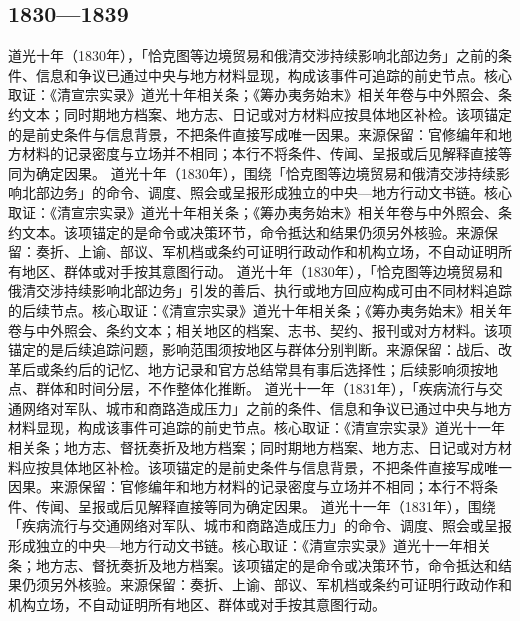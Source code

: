 \subsection{1830—1839}
道光十年（1830年），「恰克图等边境贸易和俄清交涉持续影响北部边务」之前的条件、信息和争议已通过中央与地方材料显现，构成该事件可追踪的前史节点。核心取证：《清宣宗实录》道光十年相关条；《筹办夷务始末》相关年卷与中外照会、条约文本；同时期地方档案、地方志、日记或对方材料应按具体地区补检。该项锚定的是前史条件与信息背景，不把条件直接写成唯一因果。来源保留：官修编年和地方材料的记录密度与立场并不相同；本行不将条件、传闻、呈报或后见解释直接等同为确定因果。
道光十年（1830年），围绕「恰克图等边境贸易和俄清交涉持续影响北部边务」的命令、调度、照会或呈报形成独立的中央—地方行动文书链。核心取证：《清宣宗实录》道光十年相关条；《筹办夷务始末》相关年卷与中外照会、条约文本。该项锚定的是命令或决策环节，命令抵达和结果仍须另外核验。来源保留：奏折、上谕、部议、军机档或条约可证明行政动作和机构立场，不自动证明所有地区、群体或对手按其意图行动。
道光十年（1830年），「恰克图等边境贸易和俄清交涉持续影响北部边务」引发的善后、执行或地方回应构成可由不同材料追踪的后续节点。核心取证：《清宣宗实录》道光十年相关条；《筹办夷务始末》相关年卷与中外照会、条约文本；相关地区的档案、志书、契约、报刊或对方材料。该项锚定的是后续追踪问题，影响范围须按地区与群体分别判断。来源保留：战后、改革后或条约后的记忆、地方记录和官方总结常具有事后选择性；后续影响须按地点、群体和时间分层，不作整体化推断。
道光十一年（1831年），「疾病流行与交通网络对军队、城市和商路造成压力」之前的条件、信息和争议已通过中央与地方材料显现，构成该事件可追踪的前史节点。核心取证：《清宣宗实录》道光十一年相关条；地方志、督抚奏折及地方档案；同时期地方档案、地方志、日记或对方材料应按具体地区补检。该项锚定的是前史条件与信息背景，不把条件直接写成唯一因果。来源保留：官修编年和地方材料的记录密度与立场并不相同；本行不将条件、传闻、呈报或后见解释直接等同为确定因果。
道光十一年（1831年），围绕「疾病流行与交通网络对军队、城市和商路造成压力」的命令、调度、照会或呈报形成独立的中央—地方行动文书链。核心取证：《清宣宗实录》道光十一年相关条；地方志、督抚奏折及地方档案。该项锚定的是命令或决策环节，命令抵达和结果仍须另外核验。来源保留：奏折、上谕、部议、军机档或条约可证明行政动作和机构立场，不自动证明所有地区、群体或对手按其意图行动。
